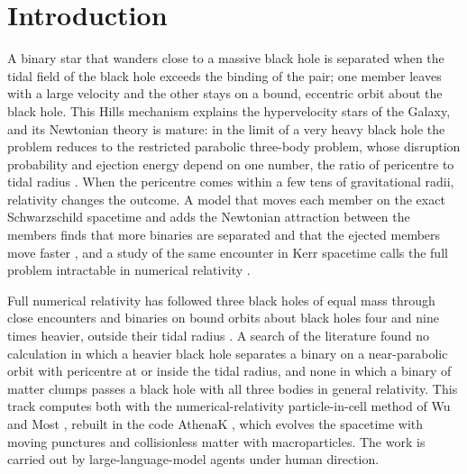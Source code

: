 \documentclass[aps,prd,twocolumn,10pt,superscriptaddress,nofootinbib,longbibliography,floatfix]{revtex4-2}
\begin{document}
\maketitle

\section{Introduction}\label{sec:intro}

A binary star that wanders close to a massive black hole is separated when the tidal field of the black hole exceeds the binding of the pair; one member leaves with a large velocity and the other stays on a bound, eccentric orbit about the black hole. This Hills mechanism explains the hypervelocity stars of the Galaxy, and its Newtonian theory is mature: in the limit of a very heavy black hole the problem reduces to the restricted parabolic three-body problem, whose disruption probability and ejection energy depend on one number, the ratio of pericentre to tidal radius \cite{Sari:2010hills,Kobayashi:2012hills,Brown:2018hills}. When the pericentre comes within a few tens of gravitational radii, relativity changes the outcome. A model that moves each member on the exact Schwarzschild spacetime and adds the Newtonian attraction between the members finds that more binaries are separated and that the ejected members move faster \cite{Manzaneda:2024geodesic}, and a study of the same encounter in Kerr spacetime calls the full problem intractable in numerical relativity \cite{Zhang:2024kerr}.

Full numerical relativity has followed three black holes of equal mass through close encounters \cite{Campanelli:2008three,Lousto:2008multiple,Heinze:2025encounters} and binaries on bound orbits about black holes four and nine times heavier, outside their tidal radius \cite{Ficarra:2024three}. A search of the literature found no calculation in which a heavier black hole separates a binary on a near-parabolic orbit with pericentre at or inside the tidal radius, and none in which a binary of matter clumps passes a black hole with all three bodies in general relativity. This track computes both with the numerical-relativity particle-in-cell method of Wu and Most \cite{Wu:2026nrpic}, rebuilt in the code AthenaK \cite{Stone:2024athenak,Zhu:2024utz}, which evolves the spacetime with moving punctures and collisionless matter with macroparticles. The work is carried out by large-language-model agents under human direction.
\end{document}
